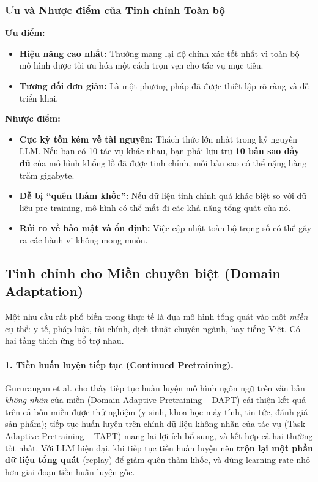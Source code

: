 \subsubsection{Ưu và Nhược điểm của Tinh chỉnh Toàn bộ}
\begin{tcolorbox}[
    title=Đánh giá Tinh chỉnh Toàn bộ (Full Fine-tuning),
    colback=blue!5!white, colframe=blue!75!black, fonttitle=\bfseries
]
\textbf{Ưu điểm:}
\begin{itemize}
    \item \textbf{Hiệu năng cao nhất:} Thường mang lại độ chính xác tốt nhất vì toàn bộ mô hình được tối ưu hóa một cách trọn vẹn cho tác vụ mục tiêu.
    \item \textbf{Tương đối đơn giản:} Là một phương pháp đã được thiết lập rõ ràng và dễ triển khai.
\end{itemize}
\textbf{Nhược điểm:}
\begin{itemize}
    \item \textbf{Cực kỳ tốn kém về tài nguyên:} Thách thức lớn nhất trong kỷ nguyên LLM. Nếu bạn có 10 tác vụ khác nhau, bạn phải lưu trữ \textbf{10 bản sao đầy đủ} của mô hình khổng lồ đã được tinh chỉnh, mỗi bản sao có thể nặng hàng trăm gigabyte.
    \item \textbf{Dễ bị “quên thảm khốc”:} Nếu dữ liệu tinh chỉnh quá khác biệt so với dữ liệu pre-training, mô hình có thể mất đi các khả năng tổng quát của nó.
    \item \textbf{Rủi ro về bảo mật và ổn định:} Việc cập nhật toàn bộ trọng số có thể gây ra các hành vi không mong muốn.
\end{itemize}
\end{tcolorbox}

\subsection{Tinh chỉnh cho Miền chuyên biệt (Domain Adaptation) \newtag}
\label{ssec:domain_adaptation}
Một nhu cầu rất phổ biến trong thực tế là đưa mô hình tổng quát vào một \emph{miền} cụ thể: y tế, pháp luật, tài chính, dịch thuật chuyên ngành, hay tiếng Việt. Có hai tầng thích ứng bổ trợ nhau.

\paragraph{1. Tiền huấn luyện tiếp tục (Continued Pretraining).} Gururangan et al. \cite{gururangan2020dontstop} cho thấy tiếp tục huấn luyện mô hình ngôn ngữ trên văn bản \emph{không nhãn} của miền (Domain-Adaptive Pretraining -- DAPT) cải thiện kết quả trên cả bốn miền được thử nghiệm (y sinh, khoa học máy tính, tin tức, đánh giá sản phẩm); tiếp tục huấn luyện trên chính dữ liệu không nhãn của tác vụ (Task-Adaptive Pretraining -- TAPT) mang lại lợi ích bổ sung, và kết hợp cả hai thường tốt nhất. Với LLM hiện đại, khi tiếp tục tiền huấn luyện nên \textbf{trộn lại một phần dữ liệu tổng quát} (replay) để giảm quên thảm khốc, và dùng learning rate nhỏ hơn giai đoạn tiền huấn luyện gốc.

